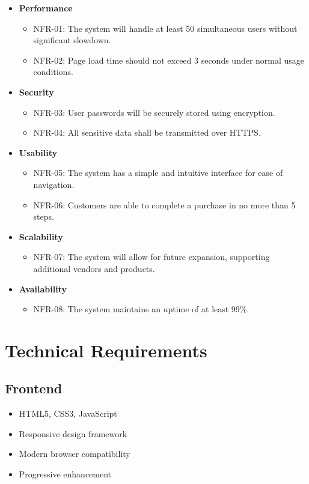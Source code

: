 \begin{itemize}
    \item \textbf{Performance}
    \begin{itemize}
        \item NFR-01: The system will handle at least 50 simultaneous users without significant slowdown.
        \item NFR-02: Page load time should not exceed 3 seconds under normal usage conditions.
    \end{itemize}
    \item \textbf{Security}
    \begin{itemize}
        \item NFR-03: User passwords will be securely stored using encryption.
        \item NFR-04: All sensitive data shall be transmitted over HTTPS.
    \end{itemize}
    \item \textbf{Usability}
    \begin{itemize}
        \item NFR-05: The system has a simple and intuitive interface for ease of navigation.
        \item NFR-06: Customers are able to complete a purchase in no more than 5 steps.
    \end{itemize}
    \item \textbf{Scalability}
    \begin{itemize}
        \item NFR-07: The system will allow for future expansion, supporting additional vendors and products.
    \end{itemize}
    \item \textbf{Availability}
    \begin{itemize}
        \item NFR-08: The system maintains an uptime of at least 99\%.
    \end{itemize}
\end{itemize}

\section{Technical Requirements}
\subsection{Frontend}
\begin{itemize}
    \item HTML5, CSS3, JavaScript
    \item Responsive design framework
    \item Modern browser compatibility
    \item Progressive enhancement
\end{itemize}

